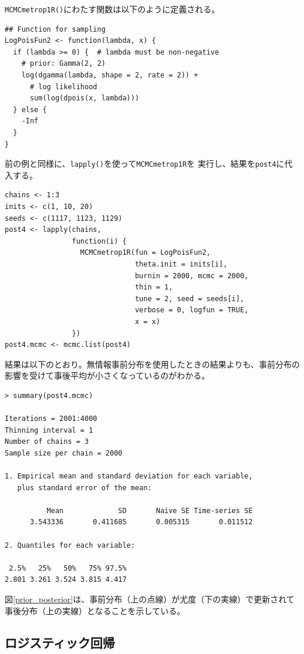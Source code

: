\documentclass[11pt,uplatex]{jsarticle}
\begin{document}
\texttt{MCMCmetrop1R()}にわたす関数は以下のように定義される。
%
\begin{lstlisting}
## Function for sampling
LogPoisFun2 <- function(lambda, x) {
  if (lambda >= 0) {  # lambda must be non-negative
    # prior: Gamma(2, 2)
    log(dgamma(lambda, shape = 2, rate = 2)) + 
      # log likelihood
      sum(log(dpois(x, lambda)))
  } else {
    -Inf
  }
}
\end{lstlisting}

前の例と同様に、\texttt{lapply()}を使って\texttt{MCMCmetrop1R}を
実行し、結果を\texttt{post4}に代入する。
%
\begin{lstlisting}
chains <- 1:3
inits <- c(1, 10, 20)
seeds <- c(1117, 1123, 1129)
post4 <- lapply(chains,
                function(i) {
                  MCMCmetrop1R(fun = LogPoisFun2,
                               theta.init = inits[i],
                               burnin = 2000, mcmc = 2000,
                               thin = 1,
                               tune = 2, seed = seeds[i],
                               verbose = 0, logfun = TRUE,
                               x = x)
                })
post4.mcmc <- mcmc.list(post4)
\end{lstlisting}

結果は以下のとおり。無情報事前分布を使用したときの結果よりも、事前分布の
影響を受けて事後平均が小さくなっているのがわかる。

\begin{lstlisting}
> summary(post4.mcmc)

Iterations = 2001:4000
Thinning interval = 1 
Number of chains = 3 
Sample size per chain = 2000 

1. Empirical mean and standard deviation for each variable,
   plus standard error of the mean:

          Mean             SD       Naive SE Time-series SE 
      3.543336       0.411685       0.005315       0.011512 

2. Quantiles for each variable:

 2.5%   25%   50%   75% 97.5% 
2.801 3.261 3.524 3.815 4.417 

\end{lstlisting}

図\ref{prior_posterior}は、事前分布（上の点線）が尤度（下の実線）で更新されて
事後分布（上の実線）となることを示している。



\subsection{ロジスティック回帰}
\label{logistic}
\end{document}

